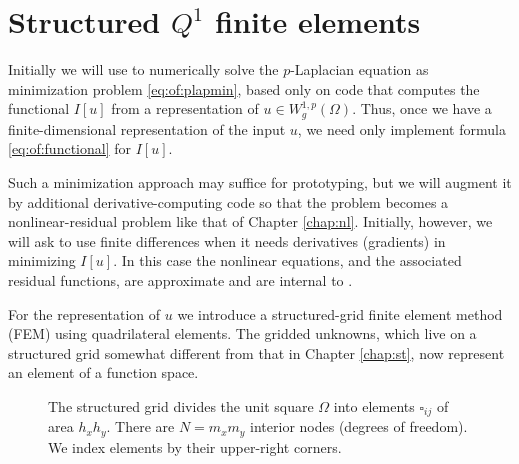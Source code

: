 \section{Structured $Q^1$ finite elements}

Initially we will use \PETSc to numerically solve the $p$-Laplacian equation as minimization problem \eqref{eq:of:plapmin}, based only on code that computes the functional $I[u]$ from a representation of $u \in W_g^{1,p}(\Omega)$.  Thus, once we have a finite-dimensional representation of the input $u$, we need only implement formula \eqref{eq:of:functional} for $I[u]$.

Such a minimization approach may suffice for prototyping, but we will augment it by additional derivative-computing code so that the problem becomes a nonlinear-residual problem like that of Chapter \ref{chap:nl}.  Initially, however, we will ask \PETSc to use finite differences when it needs derivatives (gradients) in minimizing $I[u]$.  In this case the nonlinear equations, and the associated residual functions, are approximate and are internal to \PETSc.

For the representation of $u$ we introduce a structured-grid finite element method (FEM) using quadrilateral elements.  The gridded unknowns, which live on a structured grid somewhat different from that in Chapter \ref{chap:st}, now represent an element of a function space.

\begin{figure}
\medskip

\caption{The structured grid divides the unit square $\Omega$ into elements $\square_{ij}$ of area $h_x h_y$.  There are $N=m_x m_y$ interior nodes (degrees of freedom).  We index elements by their upper-right corners.}
\label{fig:of:q1grid}
\end{figure}

